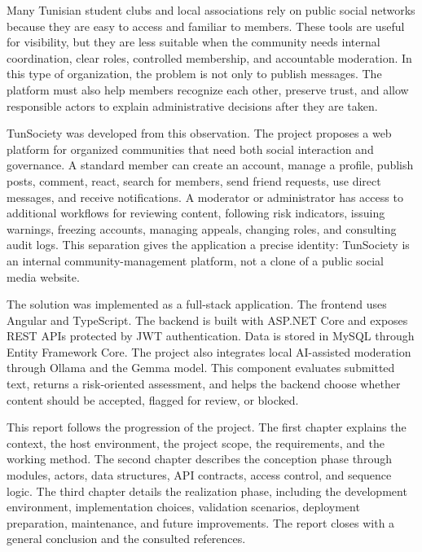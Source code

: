 Many Tunisian student clubs and local associations rely on public social networks because they are easy to access and familiar to members. These tools are useful for visibility, but they are less suitable when the community needs internal coordination, clear roles, controlled membership, and accountable moderation. In this type of organization, the problem is not only to publish messages. The platform must also help members recognize each other, preserve trust, and allow responsible actors to explain administrative decisions after they are taken.

TunSociety was developed from this observation. The project proposes a web platform for organized communities that need both social interaction and governance. A standard member can create an account, manage a profile, publish posts, comment, react, search for members, send friend requests, use direct messages, and receive notifications. A moderator or administrator has access to additional workflows for reviewing content, following risk indicators, issuing warnings, freezing accounts, managing appeals, changing roles, and consulting audit logs. This separation gives the application a precise identity: TunSociety is an internal community-management platform, not a clone of a public social media website.

The solution was implemented as a full-stack application. The frontend uses Angular and TypeScript. The backend is built with ASP.NET Core and exposes REST APIs protected by JWT authentication. Data is stored in MySQL through Entity Framework Core. The project also integrates local AI-assisted moderation through Ollama and the Gemma model. This component evaluates submitted text, returns a risk-oriented assessment, and helps the backend choose whether content should be accepted, flagged for review, or blocked.

This report follows the progression of the project. The first chapter explains the context, the host environment, the project scope, the requirements, and the working method. The second chapter describes the conception phase through modules, actors, data structures, API contracts, access control, and sequence logic. The third chapter details the realization phase, including the development environment, implementation choices, validation scenarios, deployment preparation, maintenance, and future improvements. The report closes with a general conclusion and the consulted references.
